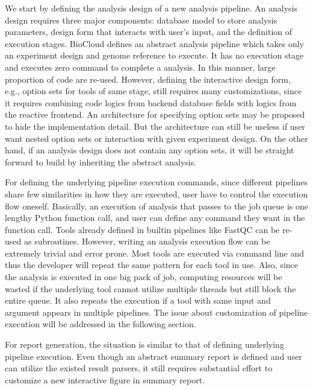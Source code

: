 We start by defining the analysis design of a new analysis pipeline. An
analysis design requires three major components: database model to store
analysis parameters, design form that interacts with user's input, and the
definition of execution stages. BioCloud defines an abstract analysis pipeline
which takes only an experiment design and genome reference to execute. It has
no execution stage and executes zero command to complete a analysis. In this
manner, large proportion of code are re-used. However, defining the interactive
design form, e.g., option sets for tools of same stage, still requires many
customizations, since it requires combining code logics from backend database
fields with logics from the reactive frontend. An architecture for specifying
option sets may be proposed to hide the implementation detail. But the
architecture can still be useless if user want nested option sets or
interaction with given experiment design. On the other hand, if an analysis
design does not contain any option sets, it will be straight forward to build
by inheriting the abstract analysis.

For defining the underlying pipeline execution commands, since different
pipelines share few similarities in how they are executed, user have to control
the execution flow oneself. Basically, an execution of analysis that passes to
the job queue is one lengthy Python function call, and user can define any
command they want in the function call. Tools already defined in builtin
pipelines like FastQC can be re-used as subroutines. However, writing an
analysis execution flow can be extremely trivial and error prone. Most tools
are executed via command line and thus the developer will repeat the same
pattern for each tool in use. Also, since the analysis is executed in one big
pack of job, computing resources will be wasted if the underlying tool cannot
utilize multiple threads but still block the entire queue. It also repeats the
execution if a tool with same input and argument appears in multiple pipelines.
The issue about customization of pipeline execution will be addressed in the
following section.

For report generation, the situation is similar to that of defining underlying
pipeline execution. Even though an abstract summary report is defined and user
can utilize the existed result parsers, it still requires substantial effort to
customize a new interactive figure in summary report.




